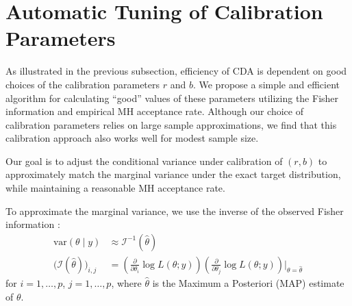\documentclass[twoside,11pt]{article}
\newcommand{\mc}[1]{\mathcal{#1}}
\newcommand{\1}{\mathbf 1}
\begin{document}
\section{{Automatic Tuning of Calibration Parameters}} \label{sec:tuning}
As illustrated in the previous subsection, efficiency of CDA is dependent on good choices of the calibration parameters $r$ and $b$.  We propose a simple and efficient algorithm for calculating ``good'' values of these parameters utilizing the Fisher information and empirical MH acceptance rate.  {Although our choice of calibration parameters relies on large sample approximations, we find that this calibration approach also works well for modest sample size.}

{
Our
goal is to adjust the conditional variance under calibration of $(r,b)$ to approximately match the marginal variance under the exact target distribution, while maintaining a reasonable MH acceptance rate.


To approximate the marginal variance, we use the inverse of the observed Fisher information \citep{efron1978assessing}:
\begin{equation*}
	\begin{aligned}
		\mbox{var} (\theta \mid y) & \approx \mc I^{-1}(\hat\theta)\\
    \bigg (\mc I(\hat\theta) \bigg)_{i,j}  &  = \left( \frac{\partial}{\partial \theta_i} \log L(\theta;y) \right) \left( \frac{\partial}{\partial \theta_j} \log L(\theta;y) \right)\bigg\vert _{\theta=\hat\theta} 
	\end{aligned}
\end{equation*}
for $i=1,\ldots,p$, $j=1,\ldots,p$, where $\hat\theta$ is the Maximum a Posteriori (MAP) estimate of $\theta$.

}
\end{document}
